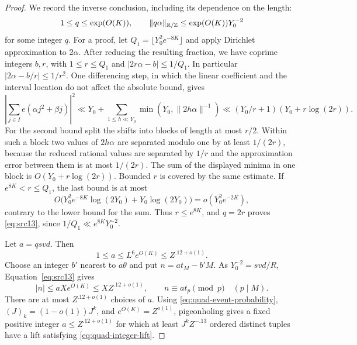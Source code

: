 \begin{proof}
We record the inverse conclusion, including its dependence on the
length:
\begin{equation}\label{eq:src13}
 1\leq q\leq\exp(O(K)),\qquad
 \|q\alpha\|_{\mathbb R/\mathbb Z}\leq\exp(O(K))Y_0^{-2}
\end{equation}
for some integer $q$.
For a proof, let $Q_1=\lfloor Y_0^2e^{-8K}\rfloor$ and apply
Dirichlet approximation to $2\alpha$.  After reducing the resulting
fraction, we have coprime integers $b,r$, with
$1\leq r\leq Q_1$ and $|2r\alpha-b|\leq1/Q_1$.
In particular $|2\alpha-b/r|\leq1/r^2$.
One differencing step, in which the linear coefficient and the
interval location do not affect the absolute bound, gives
\[
 \left|\sum_{j\in I}e(\alpha j^2+\beta j)\right|^2
 \ll Y_0+\sum_{1\leq h\ll Y_0}
                 \min(Y_0,\|2h\alpha\|^{-1})
 \ll (Y_0/r+1)(Y_0+r\log(2r)).
\]
For the second bound split the shifts into blocks of length at most
$r/2$.  Within such a block two values of $2h\alpha$ are separated
modulo one by at least $1/(2r)$, because the reduced rational values
are separated by $1/r$ and the approximation error between them is
at most $1/(2r)$.  The sum of the displayed minima in one block is
$O(Y_0+r\log(2r))$.  Bounded $r$ is covered by the same estimate.
If $e^{8K}<r\leq Q_1$, the last bound is at most
\[
 O\bigl(Y_0^2e^{-8K}\log(2Y_0)+Y_0\log(2Y_0)\bigr)
       =o(Y_0^2e^{-2K}),
\]
contrary to the lower bound for the sum.
Thus $r\leq e^{8K}$, and $q=2r$ proves
\eqref{eq:src13}, since $1/Q_1\ll e^{8K}Y_0^{-2}$.

Let $a=qsvd$.  Then
\[
 1\leq a\leq L^6e^{O(K)}\leq Z^{.12+o(1)}.
\]
Choose an integer $b'$ nearest to $a\theta$ and put
$n=at_M-b'M$.  As $Y_0^{-2}=svd/R$, Equation~\eqref{eq:src13}
gives
\begin{equation}\label{eq:quad-integer-lift}
 |n|\leq aXe^{O(K)}\leq XZ^{.12+o(1)},\qquad
 n\equiv at_p\pmod p\quad(p\mid M).
\end{equation}
There are at most $Z^{.12+o(1)}$ choices of $a$.
Using \eqref{eq:quad-event-probability}, $(J)_k=(1-o(1))J^k$, and
$e^{O(K)}=Z^{o(1)}$, pigeonholing gives a fixed positive integer
$a\leq Z^{.12+o(1)}$ for which at least $J^kZ^{-.13}$ ordered
distinct tuples have a lift satisfying \eqref{eq:quad-integer-lift}.


\end{proof}
